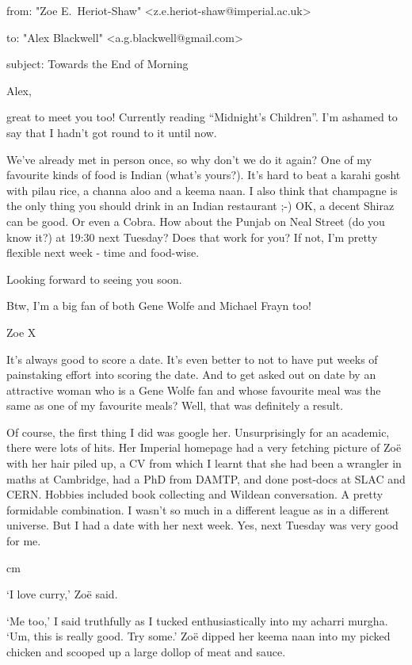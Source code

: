 {\twelvett\obeylines

from: "Zoe E.~Heriot-Shaw" <z.e.heriot-shaw@imperial.ac.uk>

to: "Alex Blackwell" <a.g.blackwell@gmail.com>

subject: Towards the End of Morning

Alex,

great to meet you too! Currently reading ``Midnight's Children''. I'm
ashamed to say that I hadn't got round to it until now.

We've already met in person once, so why don't we do it again? One
of my favourite kinds of food is Indian (what's yours?). It's hard
to beat a karahi gosht with pilau rice, a channa aloo and a keema
naan. I also think that champagne is the only thing you should drink
in an Indian restaurant ;-) OK, a decent Shiraz can be good. Or even
a Cobra. How about the Punjab on Neal Street (do you know it?) at
19:30 next Tuesday? Does that work for you? If not, I'm pretty
flexible next week - time and food-wise.

Looking forward to seeing you soon.

Btw, I'm a big fan of both Gene Wolfe and Michael Frayn too!

Zoe X}

It's always good to score a date. It's even better to not to have
put weeks of painstaking effort into scoring the date. And to get
asked out on date by an attractive woman who is a Gene Wolfe fan and
whose favourite meal was the same as one of my favourite meals?
Well, that was definitely a result.

Of course, the first thing I did was google her. Unsurprisingly for
an academic, there were lots of hits. Her Imperial homepage had a
very fetching picture of Zoë with her hair piled up, a CV from
which I learnt that she had been a wrangler in maths at Cambridge,
had a PhD from DAMTP, and done post-docs at SLAC and CERN. Hobbies
included book collecting and Wildean conversation. A pretty
formidable combination. I wasn't so much in a different league as in
a different universe. But I had a date with her next week. Yes, next
Tuesday was very good for me.

 cm

`I love curry,' Zoë said.

`Me too,' I said truthfully as I tucked enthusiastically into my
acharri murgha. `Um, this is really good. Try some.' Zoë dipped
her keema naan into my picked chicken and scooped up a large dollop
of meat and sauce.

